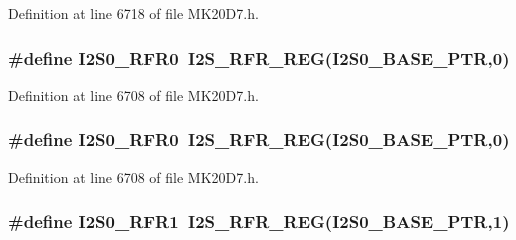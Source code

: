 Definition at line 6718 of file M\+K20\+D7.\+h.

\subsubsection[{\texorpdfstring{I2\+S0\+\_\+\+R\+F\+R0}{I2S0_RFR0}}]{\setlength{\rightskip}{0pt plus 5cm}\#define I2\+S0\+\_\+\+R\+F\+R0~{\bf I2\+S\+\_\+\+R\+F\+R\+\_\+\+R\+EG}({\bf I2\+S0\+\_\+\+B\+A\+S\+E\+\_\+\+P\+TR},0)}\hypertarget{group___i2_s___register___accessor___macros_ga4097bbe8b4d3850677060c09e0b121cc}{}\label{group___i2_s___register___accessor___macros_ga4097bbe8b4d3850677060c09e0b121cc}


Definition at line 6708 of file M\+K20\+D7.\+h.

\subsubsection[{\texorpdfstring{I2\+S0\+\_\+\+R\+F\+R0}{I2S0_RFR0}}]{\setlength{\rightskip}{0pt plus 5cm}\#define I2\+S0\+\_\+\+R\+F\+R0~{\bf I2\+S\+\_\+\+R\+F\+R\+\_\+\+R\+EG}({\bf I2\+S0\+\_\+\+B\+A\+S\+E\+\_\+\+P\+TR},0)}\hypertarget{group___i2_s___register___accessor___macros_ga4097bbe8b4d3850677060c09e0b121cc}{}\label{group___i2_s___register___accessor___macros_ga4097bbe8b4d3850677060c09e0b121cc}


Definition at line 6708 of file M\+K20\+D7.\+h.

\subsubsection[{\texorpdfstring{I2\+S0\+\_\+\+R\+F\+R1}{I2S0_RFR1}}]{\setlength{\rightskip}{0pt plus 5cm}\#define I2\+S0\+\_\+\+R\+F\+R1~{\bf I2\+S\+\_\+\+R\+F\+R\+\_\+\+R\+EG}({\bf I2\+S0\+\_\+\+B\+A\+S\+E\+\_\+\+P\+TR},1)}\hypertarget{group___i2_s___register___accessor___macros_gae1f6abd914de0f2c78acdc458367073a}{}\label{group___i2_s___register___accessor___macros_gae1f6abd914de0f2c78acdc458367073a}


